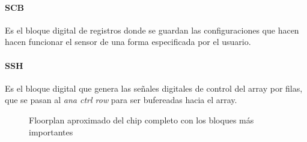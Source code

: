 \paragraph{SCB} Es el bloque digital de registros donde se guardan las configuraciones
que hacen hacen funcionar el sensor de una forma especificada por el usuario.

\paragraph{SSH} Es el bloque digital que genera las señales digitales de control
del array por filas, que se pasan al \textit{ana ctrl row} para ser bufereadas hacia el array.\\[1cm]

\begin{figure}[h]
	\centering
	
	\caption{Floorplan aproximado del chip completo con los bloques más importantes\protect\footnotemark }
	\label{fig:floorplan}
\end{figure}

